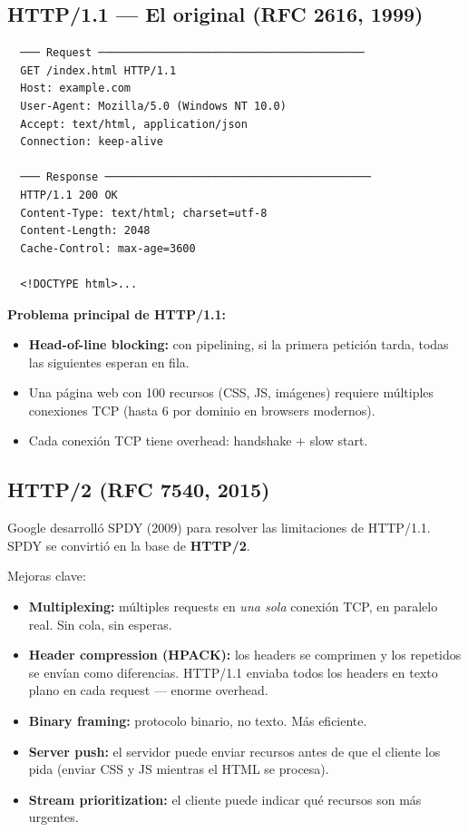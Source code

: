 \subsection{HTTP/1.1 --- El original (RFC 2616, 1999)}

\begin{lstlisting}
  ─── Request ─────────────────────────────────────────
  GET /index.html HTTP/1.1
  Host: example.com
  User-Agent: Mozilla/5.0 (Windows NT 10.0)
  Accept: text/html, application/json
  Connection: keep-alive

  ─── Response ─────────────────────────────────────────
  HTTP/1.1 200 OK
  Content-Type: text/html; charset=utf-8
  Content-Length: 2048
  Cache-Control: max-age=3600

  <!DOCTYPE html>...
\end{lstlisting}

\textbf{Problema principal de HTTP/1.1:}
\begin{itemize}
    \item \textbf{Head-of-line blocking:} con pipelining, si la primera petición
          tarda, todas las siguientes esperan en fila.
    \item Una página web con 100 recursos (CSS, JS, imágenes) requiere múltiples
          conexiones TCP (hasta 6 por dominio en browsers modernos).
    \item Cada conexión TCP tiene overhead: handshake + slow start.
\end{itemize}

\subsection{HTTP/2 (RFC 7540, 2015)}

\begin{concepto}
Google desarrolló SPDY (2009) para resolver las limitaciones de HTTP/1.1.
SPDY se convirtió en la base de \textbf{HTTP/2}.
\end{concepto}

Mejoras clave:
\begin{itemize}
    \item \textbf{Multiplexing:} múltiples requests en \textit{una sola} conexión TCP,
          en paralelo real. Sin cola, sin esperas.
    \item \textbf{Header compression (HPACK):} los headers se comprimen y los
          repetidos se envían como diferencias. HTTP/1.1 enviaba todos los headers
          en texto plano en cada request --- enorme overhead.
    \item \textbf{Binary framing:} protocolo binario, no texto. Más eficiente.
    \item \textbf{Server push:} el servidor puede enviar recursos antes de que
          el cliente los pida (enviar CSS y JS mientras el HTML se procesa).
    \item \textbf{Stream prioritization:} el cliente puede indicar qué recursos
          son más urgentes.
\end{itemize}

